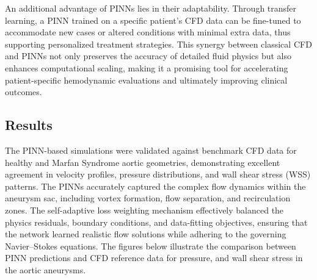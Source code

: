 \documentclass[12pt, a4paper]{article}
\begin{document}
An additional advantage of PINNs lies in their adaptability. Through transfer learning, a PINN trained on a specific patient's CFD data can be fine-tuned to accommodate new cases or altered conditions with minimal extra data, thus supporting personalized treatment strategies. This synergy between classical CFD and PINNs not only preserves the accuracy of detailed fluid physics but also enhances computational scaling, making it a promising tool for accelerating patient-specific hemodynamic evaluations and ultimately improving clinical outcomes.


\subsection{Results}
\label{sec:PINN_Results}

The PINN-based simulations were validated against benchmark CFD data for healthy and Marfan Syndrome aortic geometries, demonstrating excellent agreement in velocity profiles, pressure distributions, and wall shear stress (WSS) patterns. The PINNs accurately captured the complex flow dynamics within the aneurysm sac, including vortex formation, flow separation, and recirculation zones. The self-adaptive loss weighting mechanism effectively balanced the physics residuals, boundary conditions, and data-fitting objectives, ensuring that the network learned realistic flow solutions while adhering to the governing Navier--Stokes equations. The figures below illustrate the comparison between PINN predictions and CFD reference data for pressure, and wall shear stress in the aortic aneurysms. 
\end{document}
